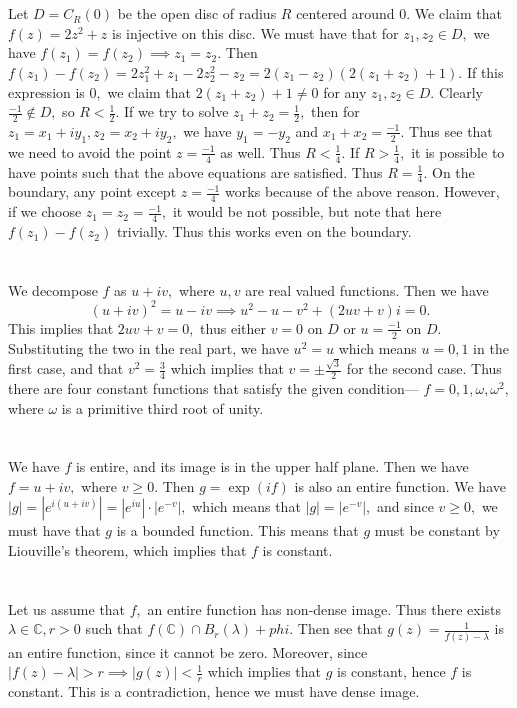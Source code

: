\documentclass{article}
\begin{document}
\section{} %
Let $D=C_R(0)$ be the open disc of radius $R$ centered around $0.$ We claim that $f(z)=2z^2+z$ is injective on this disc. We must have that for $z_1,z_2 \in 
D,$ we have $f(z_1)=f(z_2) \implies z_1=z_2.$ Then $f(z_1)-f(z_2)= 2z_1^2+z_1 - 2z_2^2 - z_2 = 2(z_1-z_2)(2(z_1+z_2)+1).$ If this expression is $0,$ we 
claim that $2(z_1+z_2)+1 \neq 0$ for any $z_1, z_2 \in D.$ Clearly $\frac{-1}{2} \notin D,$ so $R < \frac{1}{2}.$ If we try to solve $z_1+z_2=\frac{1}{2},$ 
then for $z_1=x_1+iy_1, z_2=x_2+iy_2,$ we have $y_1=-y_2$ and $x_1+x_2=\frac{-1}{2}.$ Thus see that we need to avoid the point $z=\frac{-1}{4}$ as well. 
Thus $R < \frac{1}{4}.$ If $R>\frac{1}{4},$ it is possible to have points such that the above equations are satisfied. Thus $R=\frac{1}{4}.$ On the 
boundary, any point except $z=\frac{-1}{4}$ works because of the above reason. However, if we choose $z_1=z_2=\frac{-1}{4},$ it would be not possible, but 
note that here $f(z_1)-f(z_2)$ trivially. Thus this works even on the boundary.  
\section{} %
We decompose $f$ as $u+iv,$ where $u,v$ are real valued functions. Then we have $$(u+iv)^2=u-iv \implies u^2-u-v^2 + (2uv+v)i =0.$$
This implies that $2uv+v=0,$ thus either $v=0$ on $D$ or $u= \frac{-1}{2}$ on $D.$ Substituting the two in the real part, we have $u^2=u$ which means 
$u=0,1$ in the first case, and that $ v^2=\frac{3}{4}$ which implies that $v = \pm \frac{\sqrt{3}}{2}$ for the second case. 
Thus there are four constant functions that satisfy the given condition--- $f=0, 1, \omega, \omega^2,$ where $\omega$ is a primitive third root of unity. 
\section{} %
We have $f$ is entire, and its image is in the upper half plane. Then we have $f=u+iv,$ where $v \geq 0.$ Then $g=\exp(if)$ is also an entire function. We 
have $|g| = \left| e^{i(u +iv)} \right|= \left| e^{iu} \right| \cdot \left|e^{-v}\right|,$ which means that $|g| = \left|e^{-v}\right|,$ and since $v \geq 
0,$ we must have that $g$ is a bounded function. This means that $g$ must be constant by Liouville's theorem, which implies that $f$ is constant.  
\section{} %
Let us assume that $f,$ an entire function has non-dense image. Thus there exists $\lambda \in \mathbb{C}, r>0$ such that $f(\mathbb{C}) \cap B_r(\lambda) + 
phi.$ Then see that $g(z)= \frac{1}{f(z)-\lambda}$ is an entire function, since it cannot be zero. Moreover, since $|f(z)- \lambda| > r \implies |g(z)|< 
\frac{1}{r} $ which implies that $g$ is constant, hence $f$ is constant. This is a contradiction, hence we must have dense image. 
\end{document}
